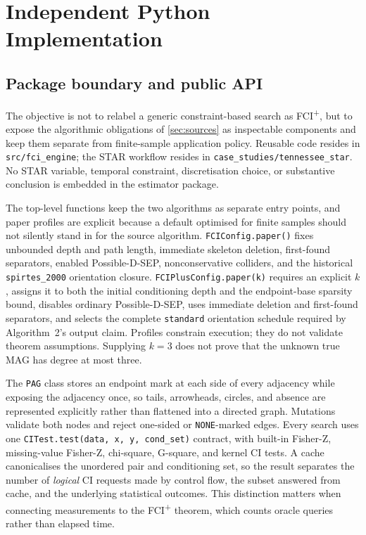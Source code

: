 \documentclass[11pt,a4paper]{article}
\newcommand{\FCIplus}{FCI\textsuperscript{+}}
\newcommand{\code}[1]{\texttt{#1}}
\begin{document}
\section{Independent Python Implementation}
\label{sec:implementation}

\subsection{Package boundary and public API}

The objective is not to relabel a generic constraint-based search as
\FCIplus{}, but to expose the algorithmic obligations of \cref{sec:sources} as
inspectable components and keep them separate from finite-sample application
policy. Reusable code resides in \code{src/fci\_engine}; the STAR workflow
resides in \code{case\_studies/tennessee\_star}. No STAR variable, temporal
constraint, discretisation choice, or substantive conclusion is embedded in the
estimator package.

The top-level functions keep the two algorithms as separate entry points, and
paper profiles are explicit because a default optimised for finite samples
should not silently stand in for the source algorithm. \code{FCIConfig.paper()}
fixes unbounded depth and path length, immediate skeleton deletion, first-found
separators, enabled Possible-D-SEP, nonconservative colliders, and the
historical \code{spirtes\_2000} orientation closure. \code{FCIPlusConfig.paper(k)}
requires an explicit \(k\), assigns it to both the initial conditioning depth
and the endpoint-base sparsity bound, disables ordinary Possible-D-SEP, uses
immediate deletion and first-found separators, and selects the complete
\code{standard} orientation schedule required by Algorithm~2's output claim.
Profiles constrain execution; they do not validate theorem assumptions.
Supplying \(k=3\) does not prove that the unknown true MAG has degree at most
three.

The \code{PAG} class stores an endpoint mark at each side of every adjacency
while exposing the adjacency once, so tails, arrowheads, circles, and absence
are represented explicitly rather than flattened into a directed graph.
Mutations validate both nodes and reject one-sided or \code{NONE}-marked edges.
Every search uses one \code{CITest.test(data, x, y, cond\_set)} contract, with
built-in Fisher-Z, missing-value Fisher-Z, chi-square, G-square, and kernel CI
tests. A cache canonicalises the unordered pair and conditioning set, so the
result separates the number of \emph{logical} CI requests made by control flow,
the subset answered from cache, and the underlying statistical outcomes. This
distinction matters when connecting measurements to the \FCIplus{} theorem,
which counts oracle queries rather than elapsed time.
\end{document}
